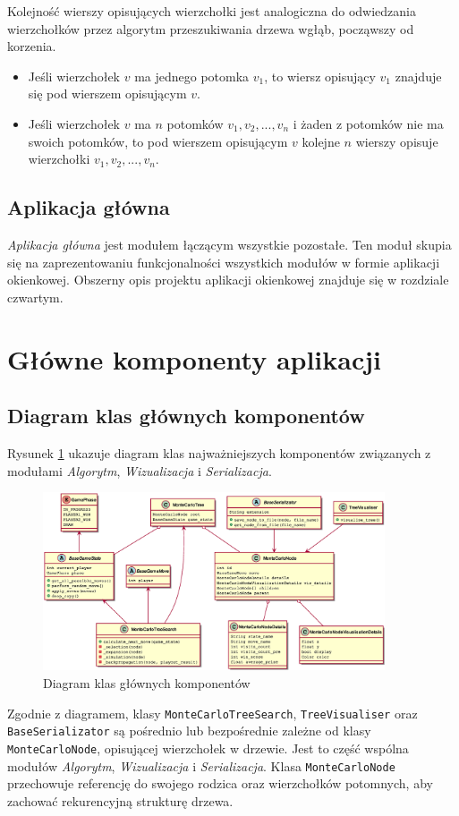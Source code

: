 \documentclass{article}
\let\oldsection\section
\renewcommand\section{\clearpage\oldsection}
\newcommand{\code}[1]{\colorbox{light-gray}{\texttt{#1}}}
\newcommand{\modulename}[1]{\textit{#1}}
\begin{document}
	\noindent Kolejność wierszy opisujących wierzchołki jest analogiczna do odwiedzania wierzchołków przez algorytm przeszukiwania drzewa wgłąb, począwszy od korzenia.\\
	\begin{itemize}
		\item Jeśli wierzchołek $v$ ma jednego potomka $v_1$, to wiersz opisujący $v_1$ znajduje się pod wierszem opisującym $v$.
		\item Jeśli wierzchołek $v$ ma $n$ potomków $v_1, v_2, ..., v_n$ i żaden z potomków nie ma swoich potomków, to pod wierszem opisującym $v$ kolejne $n$ wierszy opisuje wierzchołki $v_1, v_2, ..., v_n$.
	\end{itemize}

	\subsection{Aplikacja główna}
	\modulename{Aplikacja główna} jest modułem łączącym wszystkie pozostałe. Ten moduł skupia się na zaprezentowaniu funkcjonalności wszystkich modułów w formie aplikacji okienkowej. Obszerny opis projektu aplikacji okienkowej znajduje się w rozdziale czwartym.
	
	\section{Główne komponenty aplikacji}
	\subsection{Diagram klas głównych komponentów}
	
	\noindent Rysunek \ref{rys:umldiagrammain} ukazuje diagram klas najważniejszych komponentów związanych z modułami \modulename{Algorytm}, \modulename{Wizualizacja} i \modulename{Serializacja}.
	
	\begin{figure}[h]
		\centering
		\includegraphics[width=0.9\textwidth]{umldiagram}
		\caption{Diagram klas głównych komponentów}
		\label{rys:umldiagrammain}
	\end{figure}
	 \noindent Zgodnie z diagramem, klasy \code{MonteCarloTreeSearch}, \code{TreeVisualiser} oraz \code{BaseSerializator} są pośrednio lub bezpośrednie zależne od klasy \code{MonteCarloNode}, opisującej wierzchołek w drzewie. Jest to część wspólna modułów \modulename{Algorytm}, \modulename{Wizualizacja} i \modulename{Serializacja}. Klasa \code{MonteCarloNode} przechowuje referencję do swojego rodzica oraz wierzchołków potomnych, aby zachować rekurencyjną strukturę drzewa.\\
	
\end{document}
